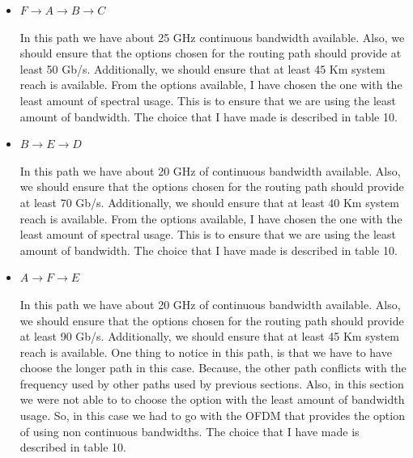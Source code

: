 \documentclass{article}
\begin{document}
\begin{itemize}
    \item $F \to A \to B \to C$
    
    In this path we have about 25 GHz continuous bandwidth available. Also, we should ensure that the options chosen for the routing path should provide at least 50 Gb/s. Additionally, we should ensure that at least 45 Km system reach is available. From the options available, I have chosen the one with the least amount of spectral usage. This is to ensure that we are using the least amount of bandwidth. The choice that I have made is described in table 10.
    
    \item $B \to E \to D$
    
    In this path we have about 20 GHz of continuous bandwidth available. Also, we should ensure that the options chosen for the routing path should provide at least 70 Gb/s. Additionally, we should ensure that at least 40 Km system reach is available.  From the options available, I have chosen the one with the least amount of spectral usage. This is to ensure that we are using the least amount of bandwidth. The choice that I have made is described in table 10.
    
    \item $A \to F \to E$
    
    In this path we have about 20 GHz of continuous bandwidth available. Also, we should ensure that the options chosen for the routing path should provide at least 90 Gb/s. Additionally, we should ensure that at least 45 Km system reach is available. One thing to notice in this path, is that we have to have choose the longer path in this case. Because, the other path conflicts with the frequency used by other paths used by previous sections. Also, in this section we were not able to to choose the option with the least amount of bandwidth usage. So, in this case we had to go with the OFDM that provides the option of using non continuous bandwidths. The choice that I have made is described in table 10.
    
\end{itemize}
\end{document}
